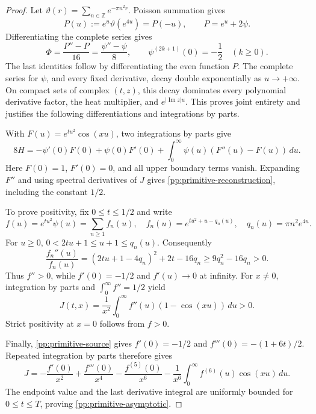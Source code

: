 \documentclass[11pt]{article}
\numberwithin{equation}{section}
\theoremstyle{definition}
\theoremstyle{remark}
\newcommand{\dd}{\,d}
\begin{document}
\begin{proof}
Let \(\vartheta(r)=\sum_{n\in\mathbb Z}e^{-\pi n^2r}\).
Poisson summation gives
\[
 P(u):=e^u\vartheta(e^{4u})=P(-u),\qquad P=e^u+2\psi.
\]
Differentiating the complete series gives
\begin{equation}
 \Phi=\frac{P''-P}{16}=\frac{\psi''-\psi}{8},\qquad
 \psi^{(2k+1)}(0)=-\frac12\quad(k\ge0).
 \label{pp:primitive-source}
\end{equation}
The last identities follow by differentiating the even function \(P\).
The complete series for \(\psi\), and every fixed derivative, decay
double exponentially as \(u\to+\infty\). On compact sets of complex
\((t,z)\), this decay dominates every polynomial derivative factor,
the heat multiplier, and \(e^{|\operatorname{Im}z|u}\). This proves
joint entirety and justifies the following differentiations and
integrations by parts.

With \(F(u)=e^{tu^2}\cos(xu)\), two integrations by parts give
\[
 8H=-\psi'(0)F(0)+\psi(0)F'(0)
                      +\int_0^\infty\psi(u)(F''(u)-F(u))\dd u.
\]
Here \(F(0)=1\), \(F'(0)=0\), and all upper boundary terms vanish.
Expanding \(F''\) and using spectral derivatives of \(J\) gives
\eqref{pp:primitive-reconstruction}, including the constant \(1/2\).

To prove positivity, fix \(0\le t\le1/2\) and write
\[
 f(u)=e^{tu^2}\psi(u)=\sum_{n\ge1}f_n(u),\quad
 f_n(u)=e^{tu^2+u-q_n(u)},\quad q_n(u)=\pi n^2e^{4u}.
\]
For \(u\ge0\), \(0<2tu+1\le u+1\le q_n(u)\). Consequently
\[
 \frac{f_n''(u)}{f_n(u)}
  =(2tu+1-4q_n)^2+2t-16q_n
  \ge9q_n^2-16q_n>0.
\]
Thus \(f''>0\), while \(f'(0)=-1/2\) and
\(f'(u)\to0\) at infinity. For \(x\ne0\), integration by parts and
\(\int_0^\infty f''=1/2\) yield
\begin{equation}
 J(t,x)=\frac1{x^2}\int_0^\infty
                  f''(u)(1-\cos(xu))\dd u>0.
 \label{pp:primitive-convex-representation}
\end{equation}
Strict positivity at \(x=0\) follows from \(f>0\).

Finally, \eqref{pp:primitive-source} gives
\(f'(0)=-1/2\) and \(f'''(0)=-(1+6t)/2\).
Repeated integration by parts therefore gives
\[
 J=-\frac{f'(0)}{x^2}+\frac{f'''(0)}{x^4}
       -\frac{f^{(5)}(0)}{x^6}
       -\frac1{x^6}\int_0^\infty f^{(6)}(u)\cos(xu)\dd u.
\]
The endpoint value and the last derivative integral are uniformly
bounded for \(0\le t\le T\), proving
\eqref{pp:primitive-asymptotic}.
\end{proof}
\end{document}
